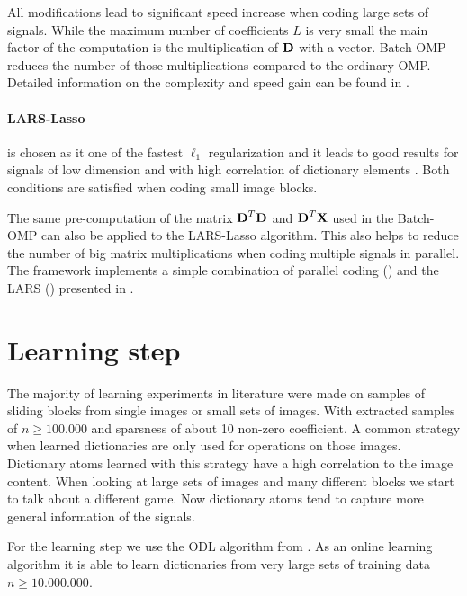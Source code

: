 All modifications lead to significant speed increase when coding large sets of
signals. While the maximum number of coefficients $L$ is very small the main
factor of the computation is the multiplication of $\boldsymbol{\mathrm{D}}$ with a vector.
Batch-OMP reduces the number of those multiplications compared to the ordinary
OMP. Detailed information on the complexity and speed gain can be found in
\cite{Rubinstein2008}. 


\paragraph{LARS-Lasso} is chosen as it one of the fastest $\ell_1$
regularization and it leads to good results for signals of low dimension and
with high correlation of dictionary elements \cite{Mairal2010}. Both conditions
are satisfied when coding small image blocks.

The same pre-computation of the matrix $\boldsymbol{\mathrm{D}}^T\boldsymbol{\mathrm{D}}$ and
$\boldsymbol{\mathrm{D}}^T\boldsymbol{\mathrm{X}}$ used in the Batch-OMP can also be applied to the LARS-Lasso
algorithm. This also helps to reduce the number of big matrix multiplications
when coding multiple signals in parallel. The framework implements a simple
combination of parallel coding () and the
LARS () presented in .

\section{Learning step}
The majority of learning experiments in literature were made on
samples of sliding blocks from single images or small sets of images.
With extracted samples of $n \ge 100.000$ and sparsness of about 10 non-zero
coefficient. A common strategy when learned dictionaries are only used for
operations on those images. Dictionary atoms learned with this strategy 
have a high correlation to the image content. 
When looking at large sets of images and many different blocks we start to talk
about a different game. Now dictionary atoms tend to capture more
general information of the signals.

For the learning step we use the ODL algorithm from . As
an online learning algorithm it is able to learn dictionaries from very large
sets of training data $n\ge 10.000.000$.


